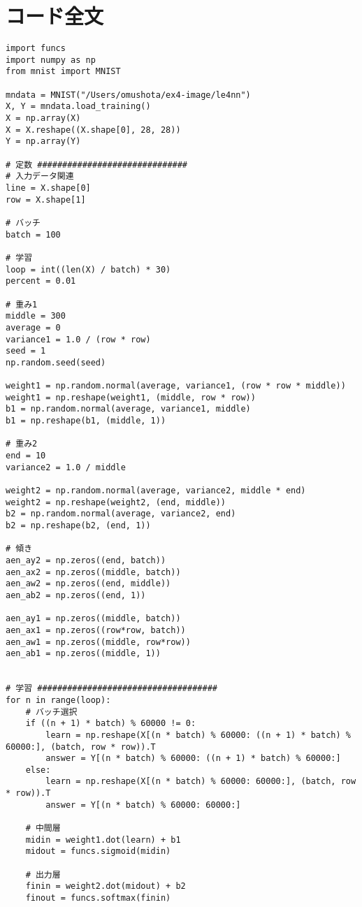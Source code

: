 \documentclass{ujarticle}
\begin{document}
\section{コード全文}
\begin{lstlisting}[basicstyle=\ttfamily\footnotesize, frame=single]
import funcs
import numpy as np
from mnist import MNIST

mndata = MNIST("/Users/omushota/ex4-image/le4nn")
X, Y = mndata.load_training()
X = np.array(X)
X = X.reshape((X.shape[0], 28, 28))
Y = np.array(Y)

# 定数 ##############################
# 入力データ関連
line = X.shape[0]
row = X.shape[1]

# バッチ
batch = 100

# 学習
loop = int((len(X) / batch) * 30)
percent = 0.01

# 重み1
middle = 300
average = 0
variance1 = 1.0 / (row * row)
seed = 1
np.random.seed(seed)

weight1 = np.random.normal(average, variance1, (row * row * middle))
weight1 = np.reshape(weight1, (middle, row * row))
b1 = np.random.normal(average, variance1, middle)
b1 = np.reshape(b1, (middle, 1))

# 重み2
end = 10
variance2 = 1.0 / middle

weight2 = np.random.normal(average, variance2, middle * end)
weight2 = np.reshape(weight2, (end, middle))
b2 = np.random.normal(average, variance2, end)
b2 = np.reshape(b2, (end, 1))

# 傾き
aen_ay2 = np.zeros((end, batch))
aen_ax2 = np.zeros((middle, batch))
aen_aw2 = np.zeros((end, middle))
aen_ab2 = np.zeros((end, 1))

aen_ay1 = np.zeros((middle, batch))
aen_ax1 = np.zeros((row*row, batch))
aen_aw1 = np.zeros((middle, row*row))
aen_ab1 = np.zeros((middle, 1))


# 学習 ####################################
for n in range(loop):
    # バッチ選択
    if ((n + 1) * batch) % 60000 != 0:
        learn = np.reshape(X[(n * batch) % 60000: ((n + 1) * batch) % 60000:], (batch, row * row)).T
        answer = Y[(n * batch) % 60000: ((n + 1) * batch) % 60000:]
    else:
        learn = np.reshape(X[(n * batch) % 60000: 60000:], (batch, row * row)).T
        answer = Y[(n * batch) % 60000: 60000:]

    # 中間層
    midin = weight1.dot(learn) + b1
    midout = funcs.sigmoid(midin)

    # 出力層
    finin = weight2.dot(midout) + b2
    finout = funcs.softmax(finin)


\end{lstlisting}
\end{document}

